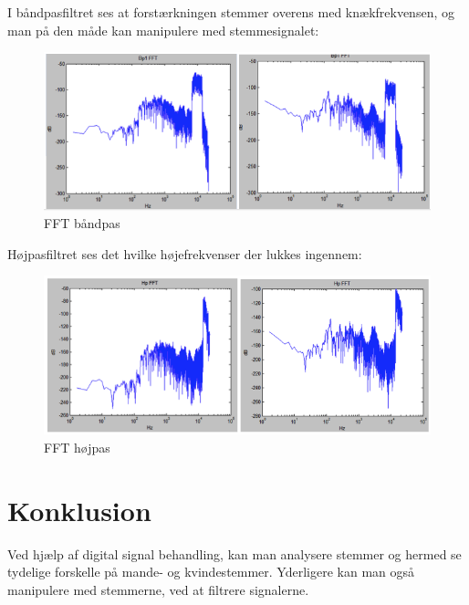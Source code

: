 I båndpasfiltret ses at forstærkningen stemmer overens med knækfrekvensen, og man på den måde kan manipulere med stemmesignalet:

\begin{figure}[H]
	\centering
	\includegraphics[width=1\textwidth]{Figurer/5}
	\caption{FFT båndpas}
	\label{FFT baandpas}
\end{figure}

Højpasfiltret ses det hvilke højefrekvenser der lukkes ingennem:

\begin{figure}[H]
	\centering
	\includegraphics[width=1\textwidth]{Figurer/6}
	\caption{FFT højpas}
	\label{FFT hoejpas}
\end{figure}

\section{Konklusion}
Ved hjælp af digital signal behandling, kan man analysere stemmer og hermed se tydelige forskelle på mande- og kvindestemmer. Yderligere kan man også manipulere med stemmerne, ved at filtrere signalerne.



